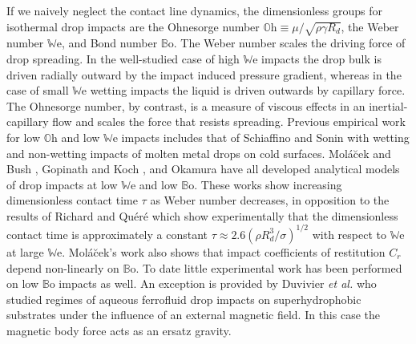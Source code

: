 \documentclass[12pt,a4paper,oneside]{book}
\begin{document}
If we naively neglect the contact line dynamics, the dimensionless groups for isothermal drop impacts are the Ohnesorge number $\mathbb{O}\mbox{h} \equiv \mu/\sqrt{\rho \gamma R_d}$, the Weber number $\mathbb{W}\mbox{e}$, and Bond number $\mathbb{B}\mbox{o}$. The Weber number scales the driving force of drop spreading. In the well-studied case of high $\mathbb{W}\mbox{e}$ impacts the drop bulk is driven radially outward by the impact induced pressure gradient, whereas in the case of small $\mathbb{W}\mbox{e}$ wetting impacts the liquid is driven outwards by capillary force. The Ohnesorge number, by contrast, is a measure of viscous effects in an inertial-capillary flow and scales the force that resists spreading. Previous empirical work for low $\mathbb{O}\mbox{h}$ and low $\mathbb{W}\mbox{e}$ impacts includes that of Schiaffino and Sonin \cite{schiaffino_molten_1997} with wetting and non-wetting impacts of molten metal drops on cold surfaces. Mol\'{a}\u{c}ek and Bush \cite{molacek_quasi-static_2012}, Gopinath and Koch \cite{gopinath_collision_2002}, and Okamura \cite{okumura_water_2003} have all developed analytical models of drop impacts at low $\mathbb{W}\mbox{e}$ and low $\mathbb{B}\mbox{o}$. These works show increasing dimensionless contact time $\tau$ as Weber number decreases, in opposition to the results of Richard and Qu\'{e}r\'{e} \cite{richard_surface_2002} which show experimentally that the dimensionless contact time is approximately a constant $\tau \approx 2.6(\rho R^3_d/\sigma)^{1/2}$ with respect to $\mathbb{W}\mbox{e}$ at large $\mathbb{W}\mbox{e}$. Mol\'{a}\u{c}ek's work also shows that impact coefficients of restitution $C_r$ depend non-linearly on $\mathbb{B}\mbox{o}$. To date little experimental work has been performed on low $\mathbb{B}\mbox{o}$ impacts as well. An exception is provided by Duvivier \emph{et al.} \cite{duvivier_drop_2012} who studied regimes of aqueous ferrofluid drop impacts on superhydrophobic substrates under the influence of an external magnetic field. In this case the magnetic body force acts as an ersatz gravity.
\end{document}
